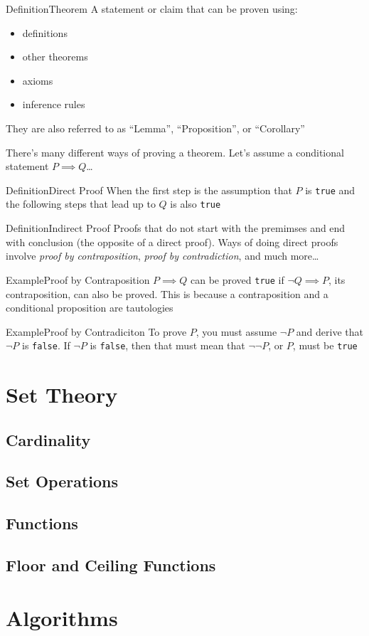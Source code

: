 \documentclass{MathNotes}
\newenvironment{example}[1]{\begin{BlueBox}{Example}{#1}}{\end{BlueBox}}
\newenvironment{definition}[1]{\begin{RedBox}{Definition}{#1}}{\end{RedBox}}
\begin{document}
\begin{definition}{Theorem}\label{def:theorem}
	A statement or claim that can be proven using:
	\begin{itemize}
		\item definitions
		\item other theorems
		\item axioms
		\item inference rules
	\end{itemize}
	They are also referred to as ``Lemma'', ``Proposition'', or ``Corollary''
\end{definition}
There's many different ways of proving a theorem. Let's assume a conditional statement $P\implies Q$\ldots
\begin{multicols}{2}
	\begin{definition}{Direct Proof}\label{def:direct-proof}
		When the first step is the assumption that $P$ is
		\texttt{true} and the following steps that lead up to $Q$ is also \texttt{true}
	\end{definition}

	\begin{definition}{Indirect Proof}\label{def:indirect-proof}
		Proofs that do not start with the premimses and end with conclusion (the opposite of a direct proof). Ways of doing direct proofs involve \textit{proof by contraposition}, \textit{proof by contradiction}, and much more\ldots
	\end{definition}

	\begin{example}{Proof by Contraposition}\label{ex:contraposition-proof}
		$P\implies Q$ can be proved \texttt{true} if $\lnot Q\implies P$, its contraposition, can also be proved. This is because a contraposition and a conditional proposition are tautologies
	\end{example}

	\begin{example}{Proof by Contradiciton}\label{ex:contradiciton-proof}
		To prove $P$, you must assume $\lnot P$ and derive that $\lnot P$ is \texttt{false}. If $\lnot P$ is \texttt{false}, then that must mean that $\lnot\lnot P$, or $P$, must be \texttt{true}
	\end{example}
\end{multicols}

\newpage
\section{Set Theory}
\subsection{Cardinality}
\subsection{Set Operations}
\subsection{Functions}
\subsection{Floor and Ceiling Functions}
\section{Algorithms}
\end{document}
